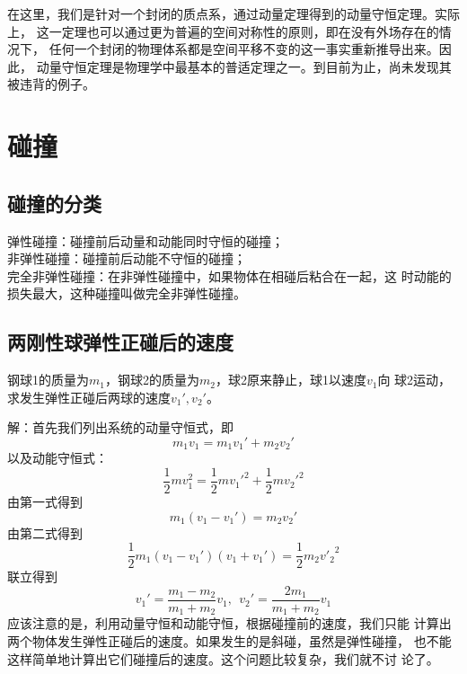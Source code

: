 在这里，我们是针对一个封闭的质点系，通过动量定理得到的动量守恒定理。实际上，
这一定理也可以通过更为普遍的空间对称性的原则，即在没有外场存在的情况下，
任何一个封闭的物理体系都是空间平移不变的这一事实重新推导出来。因此，
动量守恒定理是物理学中最基本的普适定理之一。到目前为止，尚未发现其
被违背的例子。
\section{碰撞}
\subsection{碰撞的分类}
\begin{definition}
    弹性碰撞：碰撞前后动量和动能同时守恒的碰撞；\\
    非弹性碰撞：碰撞前后动能不守恒的碰撞；\\
    完全非弹性碰撞：在非弹性碰撞中，如果物体在相碰后粘合在一起，这
    时动能的损失最大，这种碰撞叫做完全非弹性碰撞。
\end{definition}

\subsection{两刚性球弹性正碰后的速度}
\begin{eg}
    钢球1的质量为$m_1$，钢球2的质量为$m_2$，球2原来静止，球1以速度$v_1$向 
    球2运动，求发生弹性正碰后两球的速度$v_1',v_2'$。
\end{eg}

解：首先我们列出系统的动量守恒式，即 
\begin{equation}
    m_1v_1=m_1v_1'+m_2v_2'
\end{equation}
以及动能守恒式：
\begin{equation}
    \frac{1}{2}mv_1^2=\frac{1}{2}mv_1'^2+\frac{1}{2}mv_2'^2
\end{equation}
由第一式得到 
\begin{equation}
    m_1(v_1-v_1')=m_2v_2'
\end{equation}
由第二式得到 
\begin{equation}
    \frac{1}{2}m_1(v_1-v_1')(v_1+v_1')=\frac{1}{2}m_2{v'_2}^2
\end{equation}
联立得到
\begin{equation}
    v_1'=\frac{m_1-m_2}{m_1+m_2}v_1,~~v_2'=\frac{2m_1}{m_1+m_2}v_1
\end{equation}
应该注意的是，利用动量守恒和动能守恒，根据碰撞前的速度，我们只能
计算出两个物体发生弹性正碰后的速度。如果发生的是斜碰，虽然是弹性碰撞，
也不能这样简单地计算出它们碰撞后的速度。这个问题比较复杂，我们就不讨
论了。